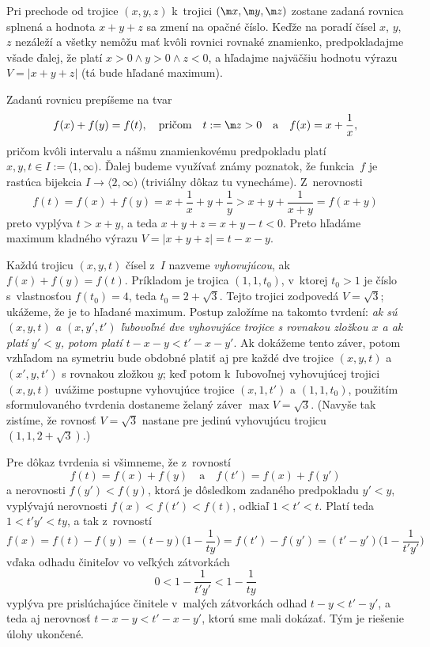 {%
Pri prechode od trojice $(x,y,z)$ k~trojici $(\m x,\m y,\m z)$
zostane zadaná rovnica splnená a hodnota $x+y+z$ sa zmení na
opačné číslo. Keďže na poradí čísel $x$, $y$, $z$ nezáleží a
všetky nemôžu mať kvôli rovnici rovnaké znamienko, predpokladajme
všade ďalej, že platí $x>0\land y>0\land z<0$,
a hľadajme najväčšiu hodnotu výrazu $V=|x+y+z|$ (tá bude hľadané maximum).

Zadanú rovnicu prepíšeme na tvar
$$
f(x)+f(y)=f(t),\quad\text{pričom}\quad t:=\m z>0\quad\text{a}\quad
f(x)=x+\frac{1}{x},
$$
pričom kvôli  intervalu a nášmu znamienkovému
predpokladu platí $x,y,t\in I:=\langle1,\infty)$.
Ďalej budeme využívať známy
poznatok, že funkcia~$f$ je rastúca bijekcia
$I\to\langle2,\infty)$ (triviálny
dôkaz tu vynecháme). Z~nerovnosti
$$
f(t)=f(x)+f(y)=x+\frac{1}{x}+y+\frac{1}{y}>x+y+\frac{1}{x+y}=f(x+y)
$$
preto vyplýva $t>x+y$, a teda $x+y+z=x+y-t<0$. Preto hľadáme
maximum kladného výrazu $V=|x+y+z|=t-x-y$.

Každú trojicu $(x,y,t)$ čísel z~$I$ nazveme {\it vyhovujúcou}, ak
$f(x)+f(y)=f(t)$. Príkladom je trojica $(1,1,t_0)$,
v~ktorej $t_0>1$ je číslo s~vlastnosťou $f(t_0)=4$, teda $t_0=2+\sqrt3$.
Tejto trojici zodpovedá $V=\sqrt3$; ukážeme, že je to hľadané
maximum. Postup založíme na takomto tvrdení: {\sl ak sú
$(x,y,t)$ a $(x,y',t')$ ľubovoľné dve vyhovujúce trojice s rovnakou zložkou
$x$ a ak platí $y'<y$, potom platí $t-x-y<t'-x-y'$}. Ak dokážeme
tento záver, potom vzhľadom na symetriu bude obdobné platiť aj
pre každé dve trojice $(x,y,t)$ a $(x',y,t')$ s rovnakou zložkou $y$;
keď potom k~ľubovoľnej vyhovujúcej trojici $(x,y,t)$ uvážime
postupne vyhovujúce trojice $(x,1,t')$ a $(1,1,t_0)$, použitím
sformulovaného tvrdenia dostaneme želaný záver $\max V=\sqrt3$.
(Navyše tak zistíme, že rovnosť $V=\sqrt3$ nastane pre
jedinú vyhovujúcu trojicu $(1,1,2+\sqrt3)$.)

Pre dôkaz tvrdenia si všimneme, že z~rovností
$$
f(t)=f(x)+f(y)\quad\text{a}\quad f(t')=f(x)+f(y')
$$
a nerovnosti $f(y')<f(y)$, ktorá je dôsledkom zadaného predpokladu $y'<y$,
vyplývajú nerovnosti $f(x)<f(t')<f(t)$, odkiaľ $1<t'<t$. Platí teda $1<t'y'<ty$,
a tak z~rovností
$$
f(x)=f(t)-f(y)=(t-y)\Biggl(1-\frac{1}{ty}\Biggr)=
f(t')-f(y')=(t'-y')\Biggl(1-\frac{1}{t'y'}\Biggr)
$$
vďaka odhadu činiteľov vo veľkých zátvorkách
$$
0<1-\frac{1}{t'y'}<1-\frac{1}{ty}
$$
vyplýva pre prislúchajúce činitele v~malých zátvorkách odhad $t-y<t'-y'$,
a teda aj nerovnosť $t-x-y<t'-x-y'$, ktorú sme mali dokázať. Tým
je riešenie úlohy ukončené.

}
